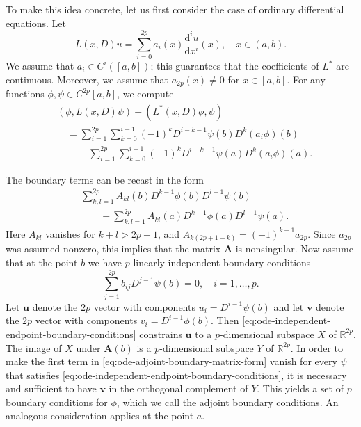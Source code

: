 To make this idea concrete, let us first consider the case of ordinary differential equations. Let
\begin{equation}\label{eq:even-order-ordinary-differential-operator}
L(x,D)u=\sum_{i=0}^{2p}a_i(x)\dfrac{\mathrm{d}^iu}{\mathrm{d}x^i}(x),\quad x\in(a,b).
\end{equation}
We assume that $a_i\in C^i([a,b])$; this guarantees that the coefficients of $L^*$ are continuous. Moreover, we assume that $a_{2p}(x)\ne0$ for $x\in[a,b]$. For any functions $\phi,\psi\in C^{2p}[a,b]$, we compute
\begin{equation}\label{eq:ode-formal-adjoint-boundary-expansion}
\begin{aligned}
&(\phi,L(x,D)\psi)-(L^*(x,D)\phi,\psi)\\
&\quad=\sum_{i=1}^{2p}\sum_{k=0}^{i-1}(-1)^kD^{i-k-1}\psi(b)D^k(a_i\phi)(b)\\
&\qquad-\sum_{i=1}^{2p}\sum_{k=0}^{i-1}(-1)^kD^{i-k-1}\psi(a)D^k(a_i\phi)(a).
\end{aligned}
\end{equation}


The boundary terms can be recast in the form
\begin{equation}\label{eq:ode-adjoint-boundary-matrix-form}
\begin{aligned}
&\sum_{k,l=1}^{2p}A_{kl}(b)D^{k-1}\phi(b)D^{l-1}\psi(b)\\
&\qquad-\sum_{k,l=1}^{2p}A_{kl}(a)D^{k-1}\phi(a)D^{l-1}\psi(a).
\end{aligned}
\end{equation}
Here $A_{kl}$ vanishes for $k+l>2p+1$, and $A_{k(2p+1-k)}=(-1)^{k-1}a_{2p}$. Since $a_{2p}$ was assumed nonzero, this implies that the matrix $\bm{A}$ is nonsingular. Now assume that at the point $b$ we have $p$ linearly independent boundary conditions
\begin{equation}\label{eq:ode-independent-endpoint-boundary-conditions}
\sum_{j=1}^{2p}b_{ij}D^{j-1}\psi(b)=0,\quad i=1,\ldots,p.
\end{equation}
Let $\bm{u}$ denote the $2p$ vector with components $u_i=D^{i-1}\psi(b)$ and let $\bm{v}$ denote the $2p$ vector with components $v_i=D^{i-1}\phi(b)$. Then \eqref{eq:ode-independent-endpoint-boundary-conditions} constrains $\bm{u}$ to a $p$-dimensional subspace $X$ of $\mathbb{R}^{2p}$. The image of $X$ under $\bm{A}(b)$ is a $p$-dimensional subspace $Y$ of $\mathbb{R}^{2p}$. In order to make the first term in \eqref{eq:ode-adjoint-boundary-matrix-form} vanish for every $\psi$ that satisfies \eqref{eq:ode-independent-endpoint-boundary-conditions}, it is necessary and sufficient to have $\bm{v}$ in the orthogonal complement of $Y$. This yields a set of $p$ boundary conditions for $\phi$, which we call the adjoint boundary conditions. An analogous consideration applies at the point $a$.

